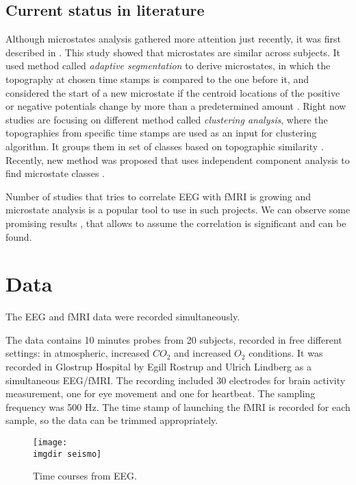 \documentclass{article}
\newcommand{\imgdir}{Images/} %
\begin{document}
\subsection{Current status in literature}
Although microstates analysis gathered more attention just recently, it was first described in \cite{lehmann1980reference}. This study showed that microstates are similar across subjects. It used method called \emph{adaptive segmentation} to derive microstates, in which the topography at chosen time stamps is compared to the one before it, and considered the start of a new microstate if the centroid locations of the positive or negative potentials change by more than a predetermined amount \cite{Khanna2015105}. Right now studies are focusing on different method called \emph{clustering analysis}, where the topographies from specific time stamps are used as an input for clustering algorithm. It groups them in set of classes based on topographic similarity \cite{Michel2009}. Recently, new method was proposed that uses independent component analysis to find microstate classes \cite{Yuan20122062}.

Number of studies that tries to correlate EEG with fMRI is growing and microstate analysis is a popular tool to use in such projects. We can observe some promising results \cite{Yuan20122062}, that allows to assume the correlation is significant and can be found. 




\section{Data}
\label{sec:data}

The EEG and fMRI data were recorded simultaneously. 

The data contains 10 minutes probes from 20 subjects, recorded in free different settings: in atmospheric, increased $CO_2$ and increased $O_2$ conditions. It was recorded in Glostrup Hospital by Egill Rostrup and Ulrich Lindberg as a simultaneous EEG/fMRI. The recording included 30 electrodes for brain activity measurement, one for eye movement and one for heartbeat. The sampling frequency was 500 Hz. The time stamp of launching the fMRI is recorded for each sample, so the data can be trimmed appropriately.

\begin{figure}[!ht]
    \centering
    \texttt{[image: \\imgdir seismo]}
    \caption{Time courses from EEG.}
    \label{fig:eeg}
\end{figure}
\end{document}
